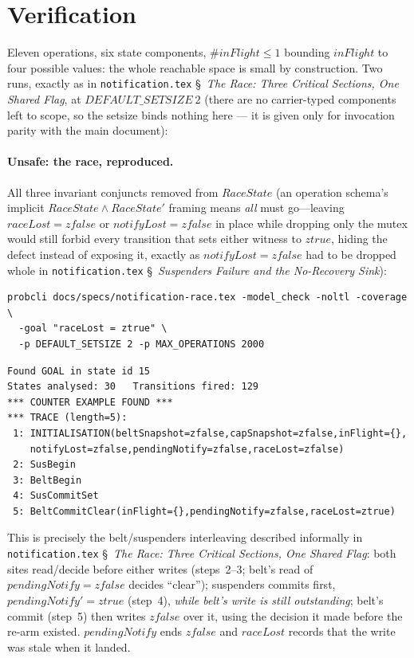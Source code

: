 \documentclass[a4paper,10pt,fleqn]{article}
\begin{document}
\section{Verification}

Eleven operations, six state components, $\# inFlight \leq 1$ bounding
$inFlight$ to four possible values: the whole reachable space is small
by construction.  Two runs, exactly as in \texttt{notification.tex}
\S~\emph{The Race: Three Critical Sections, One Shared Flag}, at $DEFAULT\_SETSIZE~2$ (there are no carrier-typed
components left to scope, so the setsize binds nothing here --- it is
given only for invocation parity with the main document):

\paragraph{Unsafe: the race, reproduced.}  All three invariant conjuncts
removed from $RaceState$ (an operation schema's implicit
$RaceState \land RaceState'$ framing means \emph{all} must go---leaving
$raceLost = zfalse$ or $notifyLost = zfalse$ in place while dropping
only the mutex would still forbid every transition that sets either
witness to $ztrue$, hiding the defect instead of exposing it, exactly
as $notifyLost = zfalse$ had to be dropped whole in
\texttt{notification.tex} \S~\emph{Suspenders Failure and the
No-Recovery Sink}):

\begin{verbatim}
probcli docs/specs/notification-race.tex -model_check -noltl -coverage \
  -goal "raceLost = ztrue" \
  -p DEFAULT_SETSIZE 2 -p MAX_OPERATIONS 2000
\end{verbatim}

\begin{verbatim}
Found GOAL in state id 15
States analysed: 30   Transitions fired: 129
*** COUNTER EXAMPLE FOUND ***
*** TRACE (length=5):
 1: INITIALISATION(beltSnapshot=zfalse,capSnapshot=zfalse,inFlight={},
    notifyLost=zfalse,pendingNotify=zfalse,raceLost=zfalse)
 2: SusBegin
 3: BeltBegin
 4: SusCommitSet
 5: BeltCommitClear(inFlight={},pendingNotify=zfalse,raceLost=ztrue)
\end{verbatim}

This is precisely the belt/suspenders interleaving described informally
in \texttt{notification.tex} \S~\emph{The Race: Three Critical Sections, One Shared Flag}: both sites read/decide
before either writes (steps~2--3; belt's read of $pendingNotify =
zfalse$ decides ``clear''); suspenders commits first,
$pendingNotify' = ztrue$ (step~4), \emph{while belt's write is still
outstanding}; belt's commit (step~5) then writes $zfalse$ over it,
using the decision it made before the re-arm existed.  $pendingNotify$
ends $zfalse$ and $raceLost$ records that the write was stale when it
landed.
\end{document}
